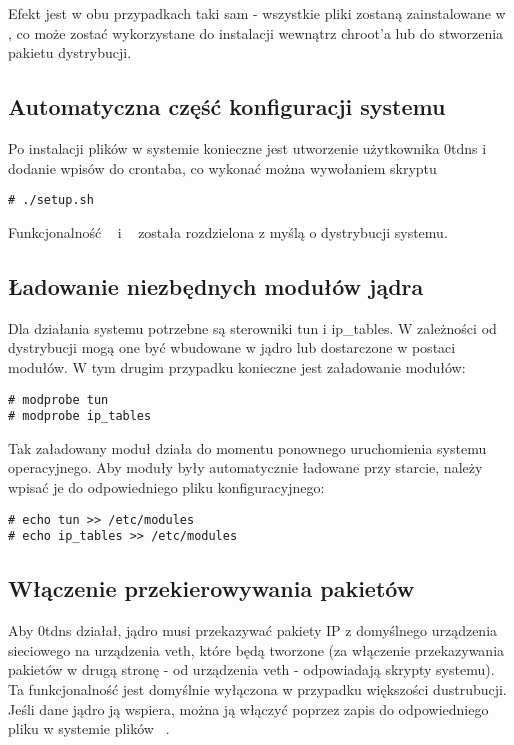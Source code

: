 \documentclass{hitec}
\newcommand{\dir}[1] {\texttt{\color{teal}  \detokenize{#1}}}
\newcommand{\file}[1] {\texttt{\color{orange} \detokenize{#1}}}
\newcommand{\filepath}[1] {\texttt{\color{violet} \detokenize{#1}}}
\begin{document}
\begin{sloppypar}
Efekt jest w obu przypadkach taki sam - wszystkie pliki zostaną
zainstalowane w \dir{/some/path/}, co może zostać wykorzystane do instalacji
wewnątrz chroot'a lub do stworzenia pakietu dystrybucji.

\subsection{Automatyczna część konfiguracji systemu}
Po instalacji plików w systemie konieczne jest utworzenie użytkownika 0tdns
i dodanie wpisów do crontaba, co wykonać można wywołaniem skryptu

\begin{verbatim}
# ./setup.sh
\end{verbatim}

Funkcjonalność \file{setup.sh} i \file{install.sh} została rozdzielona
z myślą o dystrybucji systemu.

\subsection{Ładowanie niezbędnych modułów jądra}
Dla działania systemu potrzebne są sterowniki tun i ip\_tables.
W zależności od dystrybucji mogą one być wbudowane w jądro lub dostarczone
w postaci modułów. W tym drugim przypadku konieczne jest załadowanie modułów:

\begin{verbatim}
# modprobe tun
# modprobe ip_tables
\end{verbatim}

Tak załadowany moduł działa do momentu ponownego uruchomienia systemu
operacyjnego. Aby moduły były automatycznie ładowane przy starcie, należy wpisać
je do odpowiedniego pliku konfiguracyjnego:

\begin{verbatim}
# echo tun >> /etc/modules
# echo ip_tables >> /etc/modules
\end{verbatim}

\subsection{Włączenie przekierowywania pakietów}
Aby 0tdns działał, jądro musi przekazywać pakiety IP z domyślnego urządzenia
sieciowego na urządzenia veth, które będą tworzone (za włączenie przekazywania
pakietów w drugą stronę - od urządzenia veth - odpowiadają skrypty systemu).
Ta funkcjonalność jest domyślnie wyłączona w przypadku większości dustrubucji.
Jeśli dane jądro ją wspiera, można ją włączyć poprzez zapis do odpowiedniego
pliku w systemie plików \filepath{/proc}.


\end{sloppypar}
\end{document}
